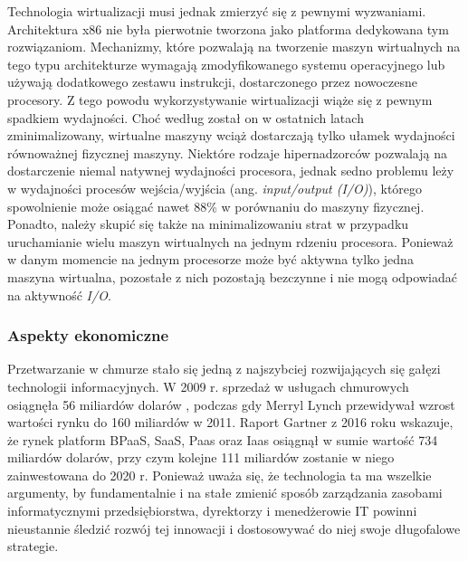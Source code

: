 \documentclass[12pt,a4paper,twoside]{article}
\begin{document}
Technologia wirtualizacji musi jednak zmierzyć się z pewnymi wyzwaniami. Architektura x86 nie była pierwotnie tworzona jako platforma dedykowana tym rozwiązaniom. Mechanizmy, które pozwalają na tworzenie maszyn wirtualnych na tego typu architekturze wymagają zmodyfikowanego systemu operacyjnego lub używają dodatkowego zestawu instrukcji, dostarczonego przez nowoczesne procesory. Z tego powodu wykorzystywanie wirtualizacji wiąże się z pewnym spadkiem wydajności. Choć według \citet{menon2005} został on w ostatnich latach zminimalizowany, wirtualne maszyny wciąż dostarczają tylko ułamek wydajności równoważnej fizycznej maszyny. Niektóre rodzaje hipernadzorców pozwalają na dostarczenie niemal natywnej wydajności procesora, jednak sedno problemu leży w wydajności procesów wejścia/wyjścia (ang. \textit{input/output (I/O)}), którego spowolnienie może osiągać nawet 88\% w porównaniu do maszyny fizycznej. Ponadto, należy skupić się także na minimalizowaniu strat w przypadku uruchamianie wielu maszyn wirtualnych na jednym rdzeniu procesora. Ponieważ w danym momencie na jednym procesorze może być aktywna tylko jedna maszyna wirtualna, pozostałe z nich pozostają bezczynne i nie mogą odpowiadać na aktywność \textit{I/O}.

\subsubsection{Aspekty ekonomiczne}

\noindent
Przetwarzanie w chmurze stało się jedną z najszybciej rozwijających się gałęzi technologii informacyjnych. W 2009 r. sprzedaż w usługach chmurowych osiągnęła 56 miliardów dolarów \citep{smith2009}, podczas gdy Merryl Lynch przewidywał wzrost wartości rynku do 160 miliardów w 2011. Raport Gartner z 2016 roku \citep{anderson2016} wskazuje, że rynek platform BPaaS, SaaS, Paas oraz Iaas osiągnął w sumie wartość 734 miliardów dolarów, przy czym kolejne 111 miliardów zostanie w niego zainwestowana do 2020 r. Ponieważ uważa się, że technologia ta ma wszelkie argumenty, by fundamentalnie i na stałe zmienić sposób zarządzania zasobami informatycznymi przedsiębiorstwa, dyrektorzy i menedżerowie IT powinni nieustannie śledzić rozwój tej innowacji i dostosowywać do niej swoje długofalowe strategie.
\end{document}
